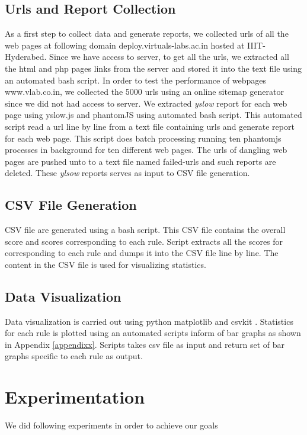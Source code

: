 \documentclass[conference]{IEEEtran}
\begin{document}
\subsection{Urls and Report Collection}\label{sec-4.1}
As a first step to collect data and generate reports, we
collected urls of all the web pages at following domain deploy.virtuals-labs.ac.in hosted at
IIIT-Hyderabed. Since we have access to server, to get all the urls, we extracted
all the html and php pages links from the server and stored it into the text file
using an automated bash script.
In order to test the performance of webpages www.vlab.co.in, we collected the 5000 urls
using an online sitemap generator since we did not had access to server.
We extracted {\it yslow} report for each web page using yslow.js and phantomJS using automated bash
script. This automated script read a url line by line from a text file containing
urls and generate report for each web page. This script does batch processing running
ten phantomjs processes in background for ten different web pages. The urls of dangling web pages 
are pushed unto to a text file named failed-urls and such reports are deleted.
These {\it ylsow} reports serves as input to CSV file generation.

\subsection{CSV File Generation}\label{sec-4.2}
CSV file are generated using a bash script. This CSV file contains the overall
score and scores corresponding to each rule. Script extracts all the scores
for corresponding to each rule and dumps it into the CSV file line by line. The
content in the CSV file is used for visualizing statistics.

\subsection{Data Visualization}\label{sec-4.3}
Data visualization is carried out using python matplotlib \cite{matplot} and csvkit \cite{csvkit}. 
Statistics for each rule is plotted using an automated
scripts inform of bar graphs as shown in Appendix \ref{appendixx}. Scripts takes csv file as input
and return set of bar graphs specific to each rule as output.

\section{Experimentation}\label{sec-5}
We did following experiments in order to achieve our goals 
\end{document}
